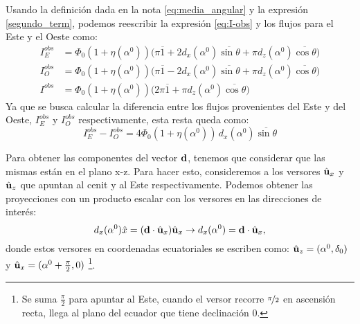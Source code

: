     
     Usando la definición dada en la nota \ref{eq:media_angular} y la expresión \ref{segundo_term}, podemos reescribir la expresión \ref{eq:I-obs} y los flujos para el Este y el Oeste como:
    \begin{align*}
    I^{obs}_E&= \Phi_0 (1+ \eta(\alpha^0)) \Big( \pi\overline{1} + 2d_x(\alpha^0)\overline{\sin\theta} + \pi d_z(\alpha^0)\overline{\cos\theta}  \Big) \\
        I^{obs}_O&= \Phi_0 (1+ \eta(\alpha^0)) \Big( \pi \overline{1} - 2d_x(\alpha^0)\overline{\sin\theta}   + \pi d_z(\alpha^0)\overline{\cos\theta} \Big) \\
        I^{obs}&= \Phi_0 (1+ \eta(\alpha^0)) \Big( 2\pi\overline{1} +\pi d_z(\alpha^0)\overline{\cos\theta}  \Big)
    \end{align*}
    Ya que se busca calcular la diferencia entre los flujos provenientes del Este y del Oeste, $I^{obs}_E $ y $  I^{obs}_O $ respectivamente, esta resta queda como:
    \begin{equation*}
        I^{obs}_E -  I^{obs}_O = 4 \Phi_0 (1+ \eta(\alpha^0)) \,  d_x(\alpha^0)\overline{\sin\theta}
    \end{equation*}

    Para obtener las componentes del vector $\bf{d}$, tenemos que considerar que las mismas están en el plano x-z. Para hacer esto, consideremos a los versores $\hat{\bf{u}}_x$ y $\hat{\bf{u}}_z$ que apuntan al cenit y al Este respectivamente. Podemos obtener las proyecciones con un producto escalar con los versores en las direcciones de interés:
    \begin{equation}
        d_x(\alpha^0) \hat{x} =  (\textbf{d}\cdot\hat{\bf{u}}_x)\hat{\bf{u}}_x \rightarrow d_x(\alpha^0) = \textbf{d}\cdot\hat{\bf{u}}_x,
    \end{equation}
    donde estos versores en coordenadas ecuatoriales se escriben como:
    $\hat{\bf{u}}_z = (\alpha^0,\delta_0 )$ y $ \hat{\bf{u}}_x = (\alpha^0 + \frac{\pi}{2},0)$ \footnote{Se suma  $\frac{\pi}{2}$ para apuntar al Este, cuando el versor recorre $\nicefrac{\pi}{2}$ en ascensión recta, llega al plano del ecuador que tiene declinación $0$.}.

